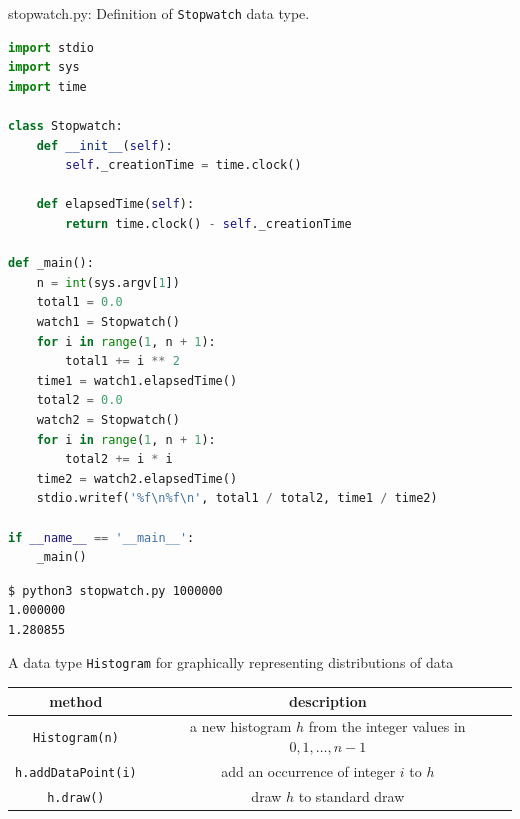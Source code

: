 \documentclass[8pt,a4paper,compress]{beamer}
\begin{document}
\begin{frame}[fragile]
\pause

\begin{framed}
\tiny stopwatch.py: Definition of \lstinline{Stopwatch} data type. 
\end{framed}

\begin{lstlisting}[language=python,style=focusin]
import stdio
import sys
import time

class Stopwatch:
    def __init__(self):
        self._creationTime = time.clock()
    
    def elapsedTime(self):
        return time.clock() - self._creationTime

def _main():
    n = int(sys.argv[1])
    total1 = 0.0
    watch1 = Stopwatch()
    for i in range(1, n + 1):
        total1 += i ** 2
    time1 = watch1.elapsedTime()    
    total2 = 0.0
    watch2 = Stopwatch()
    for i in range(1, n + 1):
        total2 += i * i
    time2 = watch2.elapsedTime()    
    stdio.writef('%f\n%f\n', total1 / total2, time1 / time2)

if __name__ == '__main__':
    _main()
\end{lstlisting}

\pause
\bigskip

\begin{lstlisting}[language={},style=focusin]
$ python3 stopwatch.py 1000000
1.000000
1.280855
\end{lstlisting}
\end{frame}

\begin{frame}[fragile]
\pause

A data type \lstinline{Histogram} for graphically representing distributions of data
\begin{center}
\begin{tabular}{cc}
method & description \\ \hline
\lstinline$Histogram(n)$ & a new histogram $h$ from the integer values in $0, 1, \dots, n-1$ \\
\lstinline$h.addDataPoint(i)$ & add an occurrence of integer $i$ to $h$ \\
\lstinline$h.draw()$ & draw $h$ to standard draw
\end{tabular} 
\end{center}
\end{frame}
\end{document}
